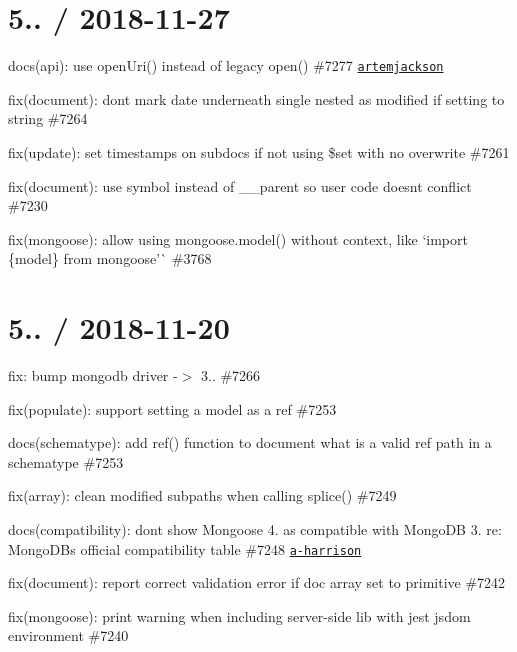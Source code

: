 \section*{5.. / 2018-\/11-\/27 }


\begin{DoxyItemize}
\item docs(api)\+: use {\ttfamily open\+Uri()} instead of legacy {\ttfamily open()} \#7277 \href{https://github.com/artemjackson}{\tt artemjackson}
\item fix(document)\+: don\textquotesingle{}t mark date underneath single nested as modified if setting to string \#7264
\item fix(update)\+: set timestamps on subdocs if not using \$set with no overwrite \#7261
\item fix(document)\+: use symbol instead of {\ttfamily \+\_\+\+\_\+parent} so user code doesn\textquotesingle{}t conflict \#7230
\item fix(mongoose)\+: allow using {\ttfamily mongoose.\+model()} without context, like `import \{model\} from \textquotesingle{}mongoose'\`{} \#3768
\end{DoxyItemize}

\section*{5.. / 2018-\/11-\/20 }


\begin{DoxyItemize}
\item fix\+: bump mongodb driver -\/$>$ 3.. \#7266
\item fix(populate)\+: support setting a model as a {\ttfamily ref} \#7253
\item docs(schematype)\+: add ref() function to document what is a valid {\ttfamily ref} path in a schematype \#7253
\item fix(array)\+: clean modified subpaths when calling {\ttfamily splice()} \#7249
\item docs(compatibility)\+: don\textquotesingle{}t show Mongoose 4. as compatible with Mongo\+DB 3. re\+: Mongo\+DB\textquotesingle{}s official compatibility table \#7248 \href{https://github.com/a-harrison}{\tt a-\/harrison}
\item fix(document)\+: report correct validation error if doc array set to primitive \#7242
\item fix(mongoose)\+: print warning when including server-\/side lib with jest jsdom environment \#7240
\end{DoxyItemize}

